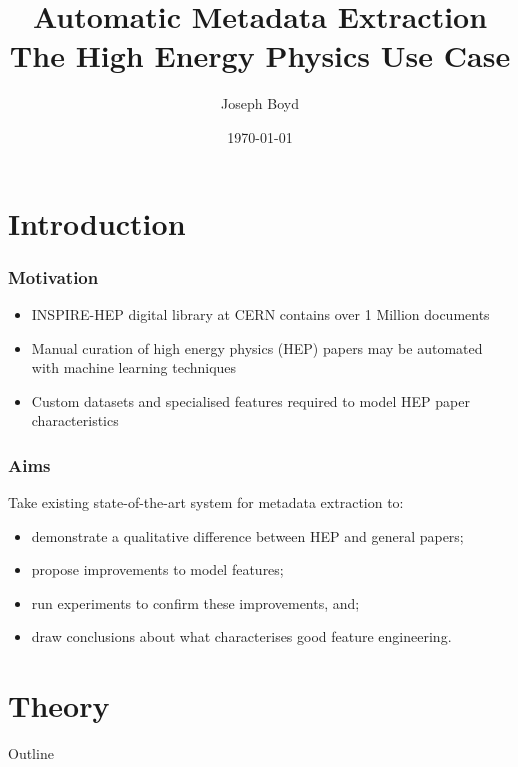 \documentclass{beamer}
\title[Automatic Metadata Extraction]{Automatic Metadata Extraction \\ The High Energy Physics Use Case} %
\author{Joseph Boyd} %
\institute[EPFL] %
{
\'Ecole Polytechnique F\'ed\'erale de Lausanne \\ %
\medskip
\textit{joseph.boyd@epfl.ch} %
}
\date{\today} %
\begin{document}
\begin{frame}
\titlepage %
\end{frame}


\section{Introduction}


\begin{frame}
\frametitle{Motivation}
\begin{itemize}
\item INSPIRE-HEP digital library at CERN contains over 1 Million documents
\item Manual curation of high energy physics (HEP) papers may be automated with machine learning techniques
\item Custom datasets and specialised features required to model HEP paper characteristics
\end{itemize}
\end{frame}


\begin{frame}
\frametitle{Aims}
Take existing state-of-the-art system for metadata extraction to:
\begin{itemize}
\item demonstrate a qualitative difference between HEP and general papers;
\item propose improvements to model features;
\item run experiments to confirm these improvements, and;
\item draw conclusions about what characterises good feature engineering.
\end{itemize}
\end{frame}


\section{Theory}


\begin{frame}[noframenumbering]{Outline}
\end{frame}
\end{document}
